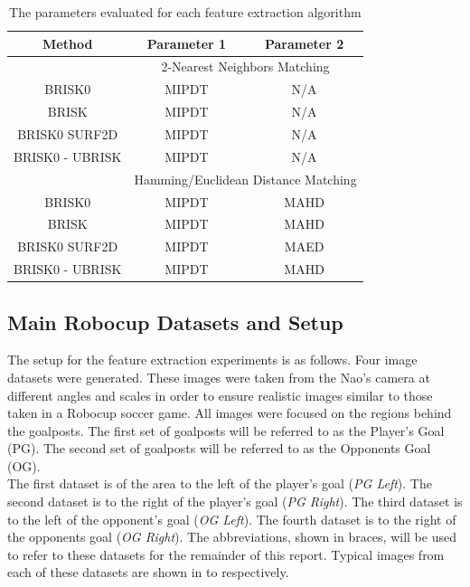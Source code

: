 \documentclass{article}
\begin{document}
\begin{table}
\caption{The parameters evaluated for each feature extraction algorithm}
\begin{tabular}{|c|c|c|}
\hline 
Method & Parameter 1 & Parameter 2\tabularnewline
\hline 
 & \multicolumn{2}{c}{2-Nearest Neighbors Matching}\tabularnewline
\hline 
BRISK0 & MIPDT & N/A\tabularnewline
\hline 
BRISK & MIPDT & N/A\tabularnewline
\hline 
BRISK0 SURF2D & MIPDT & N/A\tabularnewline
\hline 
BRISK0 - UBRISK & MIPDT & N/A\tabularnewline
\hline 
 & \multicolumn{2}{c}{Hamming/Euclidean Distance Matching}\tabularnewline
\hline 
BRISK0 & MIPDT & MAHD\tabularnewline
\hline 
BRISK & MIPDT & MAHD\tabularnewline
\hline 
BRISK0 SURF2D & MIPDT & MAED\tabularnewline
\hline 
BRISK0 - UBRISK & MIPDT & MAHD\tabularnewline
\hline 
\end{tabular}
\label{tab:parameters}
\end{table}

\subsection{Main Robocup Datasets and Setup}
\label{sec:datasets}
The setup for the feature extraction experiments is as follows. Four image datasets were generated. These images were taken from the Nao's camera at different angles and scales in order to ensure realistic images similar to those taken in a Robocup soccer game. All images were focused on the regions behind the goalposts. The first set of goalposts will be referred to as the Player's Goal (PG). The second set of goalposts will be referred to as the Opponents Goal (OG). \\


The first dataset is of the area to the left of the player's goal (\textit{PG Left}). The second dataset is to the right of the player's goal (\textit{PG Right}). The third dataset is to the left of the opponent's goal (\textit{OG Left}). The fourth dataset is to the right of the opponents goal (\textit{OG Right}). The abbreviations, shown in braces, will be used to refer to these datasets for the remainder of this report. Typical images from each of these datasets are shown in  to  respectively.\\
\end{document}

